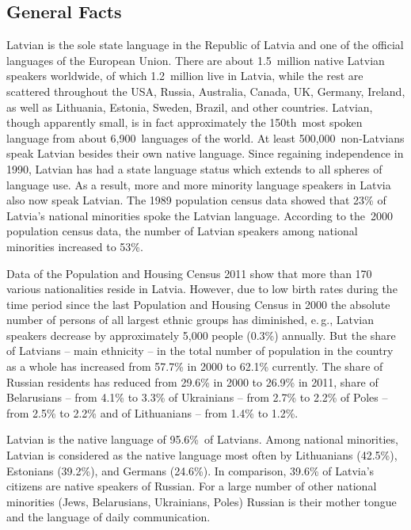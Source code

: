 \begin{multicols}{2}

\subsection{General Facts}

Latvian is the sole state language in the Republic of Latvia and one of the official languages of the European Union. There are about 1.5~million native Latvian speakers worldwide, of which 1.2~million live in Latvia, while the rest are scattered throughout the USA, Russia, Australia, Canada, UK, Germany, Ireland, as well as Lithuania, Estonia, Sweden, Brazil, and other countries.  Latvian, though apparently small, is in fact approximately the 150th~most spoken language from about 6,900~languages of the world.  At least 500,000~non-Latvians speak Latvian besides their own native language.  Since regaining independence in 1990, Latvian has had a state language status which extends to all spheres of language use.  As a result, more and more minority language speakers in Latvia also now speak Latvian.  The 1989 population census data showed that 23\% of Latvia's national minorities spoke the Latvian language.  According to the~2000 population census data, the number of Latvian speakers among national minorities increased to 53\%.


Data of the Population and Housing Census 2011 \cite{Meta54} show that more than 170 various nationalities reside in Latvia.  However, due to low birth rates during the time period since the last Population and Housing Census in 2000 the absolute number of persons of all largest ethnic groups has diminished, e.\,g., Latvian speakers decrease by approximately 5,000 people (0.3\%) annually.  But the share of Latvians -- main ethnicity -- in the total number of population in the country as a whole has increased from 57.7\% in 2000 to 62.1\% currently.  The share of Russian residents has reduced from 29.6\% in 2000 to 26.9\% in 2011, share of Belarusians -- from 4.1\% to 3.3\% of Ukrainians -- from 2.7\% to 2.2\% of Poles -- from 2.5\% to 2.2\% and of Lithuanians -- from 1.4\% to 1.2\%.

Latvian is the native language of 95.6\%~of Latvians.  Among national minorities, Latvian is considered as the native language most often by Lithuanians (42.5\%), Estonians (39.2\%), and Germans (24.6\%).  In comparison, 39.6\% of Latvia's citizens are native speakers of Russian.  For a large number of other national minorities (Jews, Belarusians, Ukrainians, Poles) Russian is their mother tongue and the language of daily communication.


\end{multicols}
